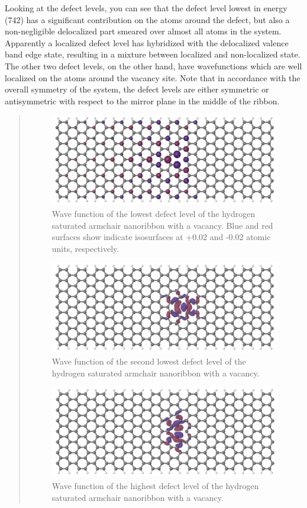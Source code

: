 \documentclass[a4paper,11pt,english]{sphinxmanual}
\begin{document}
{{Looking at the defect levels, you can see that the defect level lowest
in energy (742) has a significant contribution on the atoms around the
defect, but also a non-negligible delocalized part smeared over almost
all atoms in the system. Apparently a localized defect level has
hybridized with the delocalized valence band edge state, resulting in
a mixture between localized and non-localized state. The other two
defect levels, on the other hand, have wavefunctions which are well
localized on the atoms around the vacancy site. Note that in
accordance with the overall symmetry of the system, the defect levels
are either symmetric or antisymmetric with respect to the mirror plane
in the middle of the ribbon.
\begin{quote}
\vskip -0.2cm
\begin{figure}[htbp]
\centering
\capstart
\includegraphics[width=0.650\linewidth]{armchair-v2-def1.png}
\caption{Wave function of the lowest defect level of the hydrogen
saturated armchair nanoribbon with a vacancy. Blue and red
surfaces show indicate isosurfaces at +0.02 and -0.02 atomic
units, respectively.}\label{electstruct:fig-armchair-v2-def1}
\end{figure}
\vskip -0.2cm
\begin{figure}[htbp]
\centering
\capstart
\includegraphics[width=0.650\linewidth]{armchair-v2-def2.png}
\caption{Wave function of the second lowest defect level of the hydrogen
saturated armchair nanoribbon with a vacancy.}\label{electstruct:fig-armchair-v2-def2}
\end{figure}
\vskip -0.2cm
\begin{figure}[htbp]
\centering
\capstart
\includegraphics[width=0.650\linewidth]{armchair-v2-def3.png}
\caption{Wave function of the highest defect level of the hydrogen
saturated armchair nanoribbon with a vacancy.}\label{electstruct:fig-armchair-v2-def3}
\end{figure}
\end{quote}


}}
\end{document}
